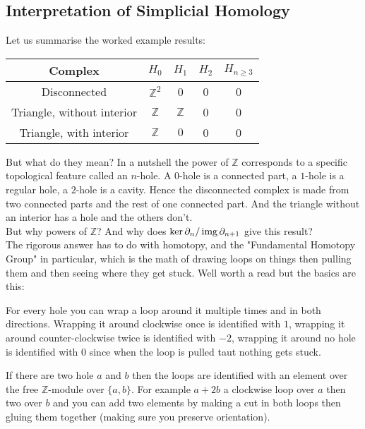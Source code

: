 \subsection{Interpretation of Simplicial Homology}
Let us summarise the worked example results:
\begin{center}
\begin{tabular}{|c|cccc|}
	\hline
	Complex & $H_0$ & $H_1$ & $H_2$ & $H_{n\geq 3}$ \\ 
	\hline
	Disconnected& $\mathbb{Z}^2$ &0&0&0 \\
	Triangle, without interior& $\mathbb{Z}$ & $\mathbb{Z}$ & 0 & 0 \\
	Triangle, with interior& $\mathbb{Z}$ & $0$ & 0 & 0 \\
	\hline
\end{tabular}
\end{center}
But what do they mean?
In a nutshell the power of $\mathbb{Z}$ corresponds to a specific topological feature called an $n$-hole.
A $0$-hole is a connected part,
a $1$-hole is a regular hole,
a $2$-hole is a cavity.
Hence the disconnected complex is made from two connected parts and the rest of one connected part.
And the triangle without an interior has a hole and the others don't.
\\

But why powers of  $\mathbb{Z}$?
And why does $\ker\partial_n / \operatorname{img}\partial_{n+1}$ give this result?
\\

The rigorous answer has to do with homotopy,
and the "Fundamental Homotopy Group" in particular,
which is the math of drawing loops on things then pulling them and then seeing where they get stuck.
Well worth a read but the basics are this:

For every hole you can wrap a loop around it multiple times and in both directions.
Wrapping it around clockwise once is identified with $1$,
wrapping it around counter-clockwise twice is identified with $-2$,
wrapping it around no hole is identified with $0$ since when the loop is pulled taut nothing gets stuck.

If there are two hole $a$ and $b$ then the loops are identified with an element over the free $\mathbb{Z}$-module over $\{a,b\}$.
For example $a+2b$ a clockwise loop over $a$ then two over $b$ and you can add two elements by making a cut in both loops then gluing them together (making sure you preserve orientation).

\begin{center}
\end{center}


